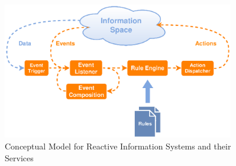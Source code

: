 \begin{figure}[!ht]
  \centering
  \includegraphics[width=0.9\textwidth]{figures/Standard-Model-Template}
  \caption{Conceptual Model for Reactive Information Systems and their Services}
  \label{fig:Standard-Model-Template}
\end{figure}







